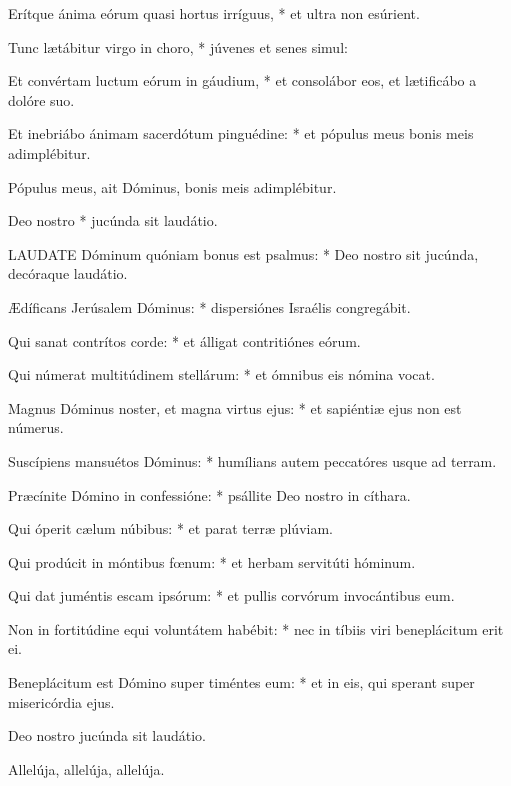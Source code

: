 Erítque ánima eórum quasi hortus irríguus, * et ultra non esúrient.

Tunc lætábitur virgo in choro, * júvenes et senes simul:

Et convértam luctum eórum in gáudium, * et consolábor eos, et lætificábo a dolóre suo.

Et inebriábo ánimam sacerdótum pinguédine: * et pópulus meus bonis meis adimplébitur.

 Pópulus meus, ait Dóminus, bonis meis adimplébitur.

 Deo nostro * jucúnda sit laudátio.


\lettrine[lines=2]{L}{AUDATE} Dóminum quóniam bonus est psalmus: * Deo nostro sit jucúnda, decóraque laudátio.

Ædíficans Jerúsalem Dóminus: * dispersiónes Israélis congregábit.

Qui sanat contrítos corde: * et álligat contritiónes eórum.

Qui númerat multitúdinem stellárum: * et ómnibus eis nómina vocat.

Magnus Dóminus noster, et magna virtus ejus: * et sapiéntiæ ejus non est númerus.

Suscípiens mansuétos Dóminus: * humílians autem peccatóres usque ad terram.

Præcínite Dómino in confessióne: * psállite Deo nostro in cíthara.

Qui óperit cælum núbibus: * et parat terræ plúviam.

Qui prodúcit in móntibus fœnum: * et herbam servitúti hóminum.

Qui dat juméntis escam ipsórum: * et pullis corvórum invocántibus eum.

Non in fortitúdine equi voluntátem habébit: * nec in tíbiis viri beneplácitum erit ei.

Beneplácitum est Dómino super timéntes eum: * et in eis, qui sperant super misericórdia ejus.


 Deo nostro jucúnda sit laudátio.


 Allelúja, allelúja, allelúja.



